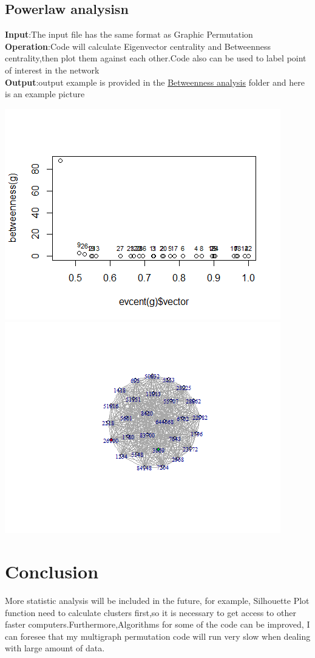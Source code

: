 \documentclass[doublespaced, 12pt]{article}
\begin{document}
\subsection{Powerlaw analysisn}
\textbf{Input}:The input file has the same format as Graphic Permutation\\
\textbf{Operation}:Code will calculate Eigenvector centrality and Betweenness centrality,then plot them against each other.Code also can be used to label point of interest in the network \\
\textbf{Output}:output example is provided in the \underline{Betweenness analysis} folder and here is an example picture 
\begin{center}
\includegraphics[scale=0.8]{outputscatterplot}
\includegraphics[scale=0.8]{outputimage}
\end{center}

\section{Conclusion}
More statistic analysis will be included in the future, for example, Silhouette Plot function need to calculate clusters first,so it is necessary to get access to other faster computers.Furthermore,Algorithms for some of the code can be improved, I can foresee that my multigraph permutation code will run very slow when dealing with large amount of data. 
\end{document}
